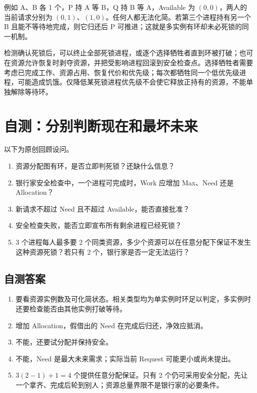例如 A、B 各 1 个，P 持 A 等 B，Q 持 B 等 A，Available 为 \((0,0)\)，两人的当前请求分别为 \((0,1)\)、\((1,0)\)。任何人都无法化简。若第三个进程持有另一个 B 且能不等待地完成，则它归还后 P 可推进；这就是多实例有环却未必死锁的同一机制。

检测确认死锁后，可以终止全部死锁进程，或逐个选择牺牲者直到环被打破；也可在资源允许恢复时剥夺资源，并把受影响进程回滚到安全检查点。选择牺牲者需要考虑已完成工作、资源占用、恢复代价和优先级；每次都牺牲同一个低优先级进程，可能造成饥饿。仅降低某死锁进程优先级不会使它释放正持有的资源，不能单独解除等待环。

\section{自测：分别判断现在和最坏未来}\label{os-4-review}

以下为原创回顾设问。

\begin{enumerate}
\def\labelenumi{\arabic{enumi}.}
\tightlist
\item
  资源分配图有环，是否立即判死锁？还缺什么信息？
\item
  银行家安全检查中，一个进程可完成时，Work 应增加 Max、Need 还是 Allocation？
\item
  新请求不超过 Need 且不超过 Available，能否直接批准？
\item
  安全检查失败，能否立即宣布所有剩余进程已经死锁？
\item
  3 个进程每人最多要 2 个同类资源，多少个资源可以在任意分配下保证不发生这种资源死锁？若只有 2 个，银行家是否一定无法运行？
\end{enumerate}

\subsection{自测答案}\label{os-c04-h173}

\begin{enumerate}
\def\labelenumi{\arabic{enumi}.}
\tightlist
\item
  要看资源实例数及可化简状态。相关类型均为单实例时环足以判定，多实例时还要检查能否由其他实例打破等待。
\item
  增加 Allocation，假借出的 Need 在完成后归还，净效应抵消。
\item
  不能，还要试分配并保持安全。
\item
  不能，Need 是最大未来需求；实际当前 Request 可能更小或尚未提出。
\item
  \(3(2-1)+1=4\) 个提供任意分配保证。只有 2 个仍可采用安全分配，先让一个拿齐、完成后轮到别人；资源总量界限不是银行家的必要条件。
\end{enumerate}

